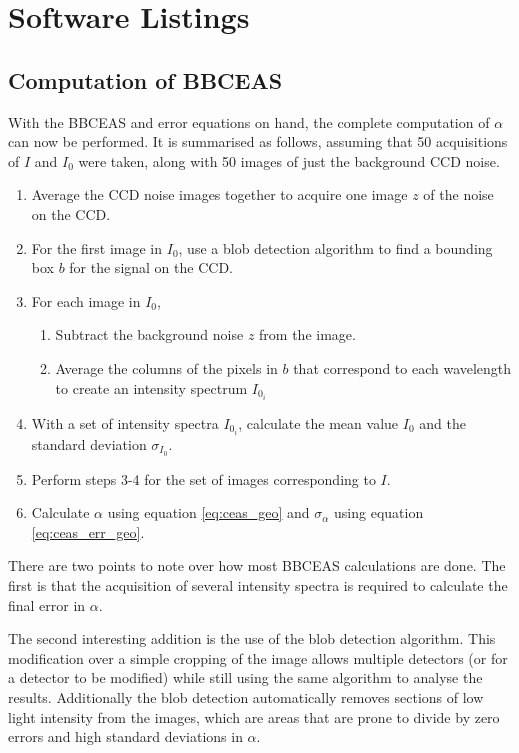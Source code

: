 \chapter{Software Listings}\label{ch:software}

\section{Computation of BBCEAS}\label{sec:comp_bbceas}


With the \ac{BBCEAS} and error equations on hand, the complete computation of
$\alpha$ can now be performed. It is summarised as follows, assuming that 50
acquisitions of $I$ and $I_0$ were taken, along with 50 images of just the
background \ac{CCD} noise.

\begin{enumerate}
  \item Average the \ac{CCD} noise images together to acquire one image $z$
        of the noise on the \ac{CCD}.
  \item For the first image in $I_0$, use a blob detection algorithm to find
        a bounding box $b$ for the signal on the \ac{CCD}.
  \item For each image in $I_0$,
    \begin{enumerate}
      \item Subtract the background noise $z$ from the image.
      \item Average the columns of the pixels in $b$ that correspond to each
        wavelength to create an intensity spectrum $I_{0_{i}}$
    \end{enumerate}
  \item With a set of intensity spectra $I_{0_i}$, calculate the mean value
        $I_0$ and the standard deviation $\sigma_{I_0}$.
  \item Perform steps 3-4 for the set of images corresponding to $I$.
  \item Calculate $\alpha$ using equation \eqref{eq:ceas_geo} and
    $\sigma_\alpha$ using equation \eqref{eq:ceas_err_geo}.
\end{enumerate}

There are two points to note over how most \ac{BBCEAS} calculations are done.
The first is that the acquisition of several intensity spectra is required to
calculate the final error in $\alpha$.

The second interesting addition is the use of the blob detection algorithm.
This modification over a simple cropping of the image allows multiple
detectors (or for a detector to be modified) while still using the same
algorithm to analyse the results. Additionally the blob detection
automatically removes sections of low light intensity from the images, which
are areas that are prone to divide by zero errors and high standard deviations
in $\alpha$.

